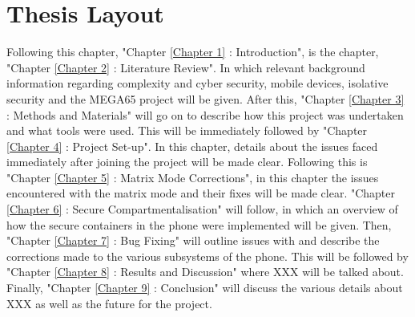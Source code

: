 \section{Thesis Layout}

\label{Ch1 Sec3}

Following this chapter, "Chapter \ref{Chapter 1} : Introduction", is the chapter, "Chapter \ref{Chapter 2} : Literature Review". In which relevant background information regarding complexity and cyber security, mobile devices, isolative security and the MEGA65 project will be given. After this, "Chapter \ref{Chapter 3} : Methods and Materials" will go on to describe how this project was undertaken and what tools were used. This will be immediately followed by "Chapter \ref{Chapter 4} : Project Set-up". In this chapter, details about the issues faced immediately after joining the project will be made clear. Following this is "Chapter \ref{Chapter 5} : Matrix Mode Corrections", in this chapter the issues encountered with the matrix mode and their fixes will be made clear. "Chapter \ref{Chapter 6} : Secure Compartmentalisation" will follow, in which an overview of how the secure containers in the phone were implemented will be given. Then, "Chapter \ref{Chapter 7} : Bug Fixing" will outline issues with and describe the corrections made to the various subsystems of the phone. This will be followed by "Chapter \ref{Chapter 8} : Results and Discussion" where XXX will be talked about. Finally, "Chapter \ref{Chapter 9} : Conclusion" will discuss the various details about XXX as well as the future for the project.

